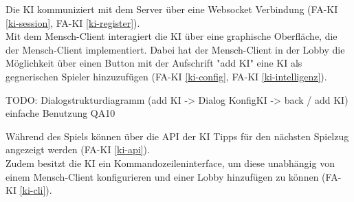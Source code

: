 Die KI kommuniziert mit dem Server über eine Websocket Verbindung (FA-KI \ref{ki-session}, FA-KI \ref{ki-register}).\\
Mit dem Mensch-Client interagiert die KI über eine graphische Oberfläche, die der Mensch-Client implementiert. Dabei hat der Mensch-Client in der Lobby die Möglichkeit über einen Button mit der Aufschrift "add KI" eine KI als gegnerischen Spieler hinzuzufügen (FA-KI \ref{ki-config}, FA-KI \ref{ki-intelligenz}).

TODO: Dialogstrukturdiagramm (add KI -> Dialog KonfigKI -> back / add KI) einfache Benutzung QA10

Während des Spiels können über die API der KI Tipps für den nächsten Spielzug angezeigt werden (FA-KI \ref{ki-api}).\\
Zudem besitzt die KI ein Kommandozeileninterface, um diese unabhängig von einem Mensch-Client konfigurieren und einer Lobby hinzufügen zu können (FA-KI \ref{ki-cli}).